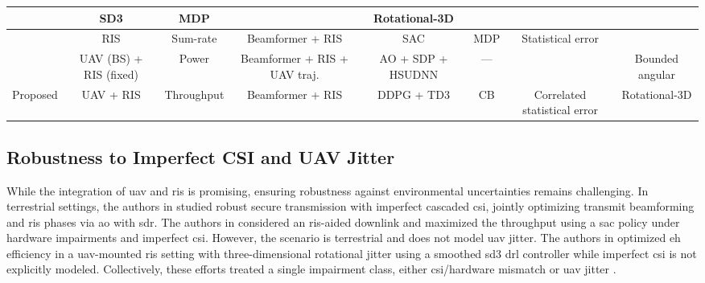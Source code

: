 \documentclass[letterpaper,journal]{IEEEtran}
\newcommand{\xmark}{\ding{55}}%
\begin{document}
\begin{table}[t]
{\begin{tabular}{cccccccc}
                     & SD3              & MDP        & \xmark                         & Rotational-3D          \\
\hline
\cite{saglam2023deep} & RIS              & Sum-rate                         & Beamformer + RIS 
                     & SAC              & MDP        & Statistical error         & \xmark                 \\
\hline
\cite{adam2023intelligent}  & UAV (BS) + RIS (fixed) & Power & Beamformer + RIS  + UAV traj.  & AO + SDP + HSUDNN  & ---  & \xmark  & Bounded angular \\
\hline
Proposed              & UAV + RIS        & Throughput                         & Beamformer + RIS 
                     & DDPG + TD3       & CB         & Correlated statistical error        & Rotational-3D          \\
\hline
\end{tabular}
}
\label{tab:comparison}
\end{table}


\subsection{Robustness to Imperfect CSI and UAV Jitter}

While the integration of \gls{uav} and \gls{ris} is promising, ensuring robustness against environmental uncertainties remains challenging. In terrestrial settings, the authors in \cite{9293148} studied robust secure transmission with imperfect cascaded \gls{csi}, jointly optimizing transmit beamforming and \gls{ris} phases via \gls{ao} with \gls{sdr}. The authors in \cite{saglam2023deep} considered an \gls{ris}-aided downlink and maximized the throughput using a \gls{sac} policy under hardware impairments and imperfect \gls{csi}. However, the scenario is terrestrial and does not model \gls{uav} jitter. 
The authors in \cite{salim2025robust} optimized \gls{eh} efficiency in a \gls{uav}-mounted \gls{ris} setting with three-dimensional rotational jitter using a smoothed \gls{sd3} \gls{drl} controller while imperfect \gls{csi} is not explicitly modeled. Collectively, these efforts treated a single impairment class, either \gls{csi}/hardware mismatch \cite{9293148,saglam2023deep,bansal2023ris} or \gls{uav} jitter \cite{salim2025robust}.
\end{document}
